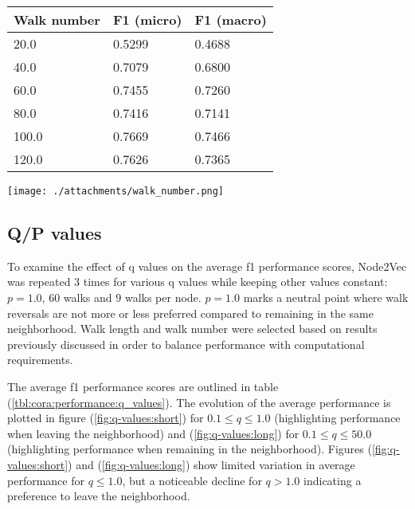 \documentclass[a4paper,10pt]{article}
\begin{document}
  \begin{minipage}[t][17em][c]{0.49\textwidth}
    \begin{tabular}{m{4em} m{7em} m{7em}}

      \hline
      Walk number & F1 (micro)  & F1 (macro) \\
      \hline\hline

      20.0	&  0.5299	&  0.4688 \\
      \hline
      40.0	&  0.7079	&  0.6800 \\
      \hline
      60.0	&  0.7455	&  0.7260 \\
      \hline
      80.0	&  0.7416	&  0.7141 \\
      \hline
      100.0	&  0.7669	&  0.7466 \\
      \hline
      120.0	&  0.7626	&  0.7365 \\
      \hline

    \end{tabular}

    \label{tbl:cora:performance:walk_number}
  \end{minipage}
  \begin{minipage}[t][17em][c]{0.49\textwidth}
    \texttt{[image: ./attachments/walk\_number.png]}
      \label{fig:cora:performance:walk_number}
  \end{minipage}

\subsection{Q/P values}

To examine the effect of q values on the average f1 performance scores, Node2Vec was repeated 3 times for various q values while keeping other values constant: $p = 1.0$, $60$ walks and $9$ walks per node. $p = 1.0$ marks a neutral point where walk reversals are not more or less preferred compared to remaining in the same neighborhood. Walk length and walk number were selected based on results previously discussed in order to balance performance with computational requirements.

The average f1 performance scores are outlined in table (\ref{tbl:cora:performance:q_values}). The evolution of the average performance is plotted in figure (\ref{fig:q-values:short}) for $0.1 \le q \le 1.0$ (highlighting performance when leaving the neighborhood) and (\ref{fig:q-values:long}) for $0.1 \le q \le 50.0$ (highlighting performance when remaining in the neighborhood). Figures (\ref{fig:q-values:short}) and (\ref{fig:q-values:long}) show limited variation in average performance for $q \le 1.0$, but a noticeable decline for $q > 1.0$ indicating a preference to leave the neighborhood.
\end{document}
